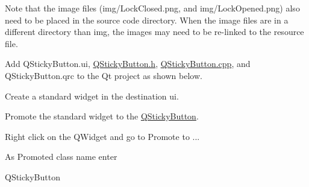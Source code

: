 \begin{DoxyEnumerate}
\begin{DoxyItemize}
Note that the image files ({\ttfamily img/\-Lock\-Closed.\-png}, and {\ttfamily img/\-Lock\-Opened.\-png}) also need to be placed in the source code directory. When the image files are in a different directory than {\ttfamily img}, the images may need to be re-\/linked to the resource file.
\item Add {\ttfamily Q\-Sticky\-Button.\-ui}, \hyperlink{_q_sticky_button_8h}{Q\-Sticky\-Button.\-h}, \hyperlink{_q_sticky_button_8cpp}{Q\-Sticky\-Button.\-cpp}, and {\ttfamily Q\-Sticky\-Button.\-qrc} to the Qt project as shown below. 
\end{DoxyItemize}
\item Create a standard widget in the destination {\ttfamily ui}.
\item Promote the standard widget to the \hyperlink{class_q_sticky_button}{Q\-Sticky\-Button}.
\begin{DoxyItemize}
\item Right click on the {\ttfamily Q\-Widget} and go to {\ttfamily Promote to ...}
\item As {\ttfamily Promoted class name} enter\begin{DoxyVerb}QStickyButton \end{DoxyVerb}


\end{DoxyItemize}
\end{DoxyEnumerate}
